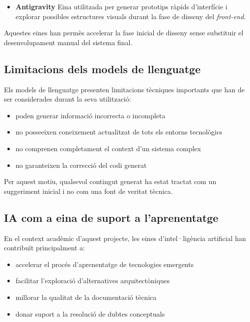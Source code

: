 \begin{itemize}

\item \textbf{Antigravity}  
Eina utilitzada per generar prototips ràpids d'interfície i explorar possibles estructures visuals durant la fase de disseny del \textit{front-end}.

\end{itemize}

Aquestes eines han permès accelerar la fase inicial de disseny sense substituir el desenvolupament manual del sistema final.

\subsection{Limitacions dels models de llenguatge}

Els models de llenguatge presenten limitacions tècniques importants que han de ser considerades durant la seva utilització:

\begin{itemize}

\item poden generar informació incorrecta o incompleta
\item no posseeixen coneixement actualitzat de tots els entorns tecnològics
\item no comprenen completament el context d'un sistema complex
\item no garanteixen la correcció del codi generat

\end{itemize}

Per aquest motiu, qualsevol contingut generat ha estat tractat com un suggeriment inicial i no com una font de veritat tècnica.

\subsection{IA com a eina de suport a l'aprenentatge}

En el context acadèmic d'aquest projecte, les eines d'intel·ligència artificial han contribuït principalment a:

\begin{itemize}

\item accelerar el procés d'aprenentatge de tecnologies emergents
\item facilitar l'exploració d'alternatives arquitectòniques
\item millorar la qualitat de la documentació tècnica
\item donar suport a la resolució de dubtes conceptuals

\end{itemize}


